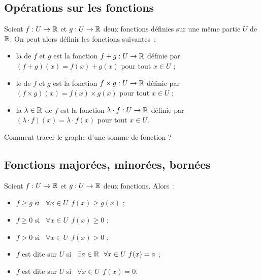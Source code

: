 \documentclass[class=report,crop=false]{standalone}
\begin{document}
\subsection{Opérations sur les fonctions}

Soient $f:U\to \mathbb{R}$ et $g:U\to \mathbb{R}$ deux fonctions définies sur une
même partie $U$ de $\mathbb{R}$. On peut alors définir les fonctions suivantes~:
\begin{itemize}
  \item la  de $f$ et $g$ est la fonction $f+g:U\to \mathbb{R}$
  définie par $(f+g)(x) = f(x) + g(x)$ pour tout $x\in U$ ;
  \item le  de $f$ et $g$ est la fonction $f\times g:U\to \mathbb{R}$
  définie par $(f\times g)(x) = f(x) \times g(x)$ pour tout $x\in U$ ;
  \item la  $\lambda\in\mathbb{R}$ de $f$ est
  la fonction $\lambda\cdot f:U\to \mathbb{R}$ définie par
  $(\lambda\cdot f)(x) =\lambda\cdot f(x)$ pour tout $x\in U$.
\end{itemize}

Comment tracer le graphe d'une somme de fonction ?

\subsection{Fonctions majorées, minorées, bornées}

\begin{definition}
Soient $f:U\to \mathbb{R}$ et $g:U\to \mathbb{R}$ deux fonctions. Alors~:
\begin{itemize}
  \item $f\geq g$ si \ $\forall x \in U \ \  f(x)\geq g(x)$ ;
  \item $f\geq 0$ si \ $\forall x \in U \ \ f(x)\geq 0$ ;
  \item $f> 0$ si \ $\forall x \in U \ \ f(x)> 0$ ;
  \item $f$ est dite  sur $U$ si \ $\exists a\in\Rr \ \ \forall x\in U \ f(x)=a$ ;
  \item $f$ est dite  sur $U$ si \ $\forall x\in U \ \ f(x)=0$.
\end{itemize}
\end{definition}
\end{document}
